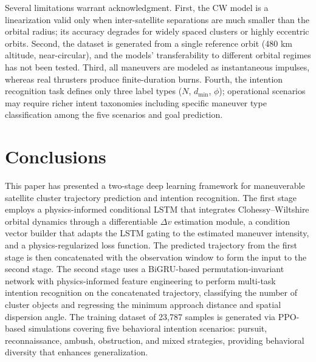 \documentclass[a4paper,fleqn]{cas-dc}
\begin{document}
Several limitations warrant acknowledgment. First, the CW model is a linearization valid only when inter-satellite separations are much smaller than the orbital radius; its accuracy degrades for widely spaced clusters or highly eccentric orbits. Second, the dataset is generated from a single reference orbit (480 km altitude, near-circular), and the models' transferability to different orbital regimes has not been tested. Third, all maneuvers are modeled as instantaneous impulses, whereas real thrusters produce finite-duration burns. Fourth, the intention recognition task defines only three label types ($N$, $d_{\min}$, $\phi$); operational scenarios may require richer intent taxonomies including specific maneuver type classification among the five scenarios and goal prediction.

\section{Conclusions}\label{sec:conclusions}

This paper has presented a two-stage deep learning framework for maneuverable satellite cluster trajectory prediction and intention recognition. The first stage employs a physics-informed conditional LSTM that integrates Clohessy--Wiltshire orbital dynamics through a differentiable $\Delta v$ estimation module, a condition vector builder that adapts the LSTM gating to the estimated maneuver intensity, and a physics-regularized loss function. The predicted trajectory from the first stage is then concatenated with the observation window to form the input to the second stage. The second stage uses a BiGRU-based permutation-invariant network with physics-informed feature engineering to perform multi-task intention recognition on the concatenated trajectory, classifying the number of cluster objects and regressing the minimum approach distance and spatial dispersion angle. The training dataset of 23,787 samples is generated via PPO-based simulations covering five behavioral intention scenarios: pursuit, reconnaissance, ambush, obstruction, and mixed strategies, providing behavioral diversity that enhances generalization.
\end{document}
